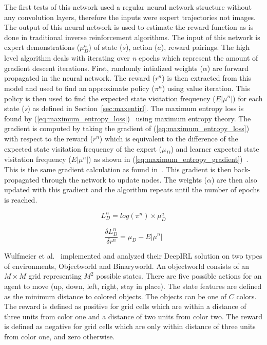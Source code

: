 \documentclass[12pt,american]{report}
\begin{document}
The first tests of this network used a regular neural network structure without any convolution layers, therefore the inputs were expert trajectories not images. The output of this neural network is used to estimate the reward function as is done in traditional inverse reinforcement algorithms. The input of this network is expert demonstrations ($\mu_{D}^{a}$) of state ($s$), action ($a$), reward pairings. The high level algorithm deals with iterating over \textit{n} epochs which represent the amount of gradient descent iterations. First, randomly intialized weights ($\alpha$) are forward propagated in the neural network.  The reward ($r^n$) is then extracted from this model and used to find an approximate policy ($\pi^n$) using value iteration. This policy is then used to find the expected state visitation frequency ($E|\mu^n|$) for each state (\textit{s}) as defined in Section~\ref{sec:maxentirl}.  The maximum entropy loss is found by (\ref{eq:maximum_entropy_loss})~\cite{wulfmeier2015maximum} using maximum entropy theory. The gradient is computed by taking the gradient of (\ref{eq:maximum_entropy_loss}) with respect to the reward ($r^n$) which is equivalent to the difference of the expected state visitation frequency of the expert ($\mu_D$) and learner expected state visitation frequency ($E|\mu^n|$) as shown in (\ref{eq:maximum_entropy_gradient})~\cite{wulfmeier2015maximum}.  This is the same gradient calculation as found in~\cite{ziebart2008maximum}.  This gradient is then back-propagated through the network to update nodes.  The weights ($\alpha$) are then also updated with this gradient and the algorithm repeats until the number of epochs is reached. 

\begin{equation}
            \label{eq:maximum_entropy_loss}
            L_{D}^{n}=log(\pi^n) \times \mu_{D}^{a}%
        \end{equation}

\begin{equation}
            \label{eq:maximum_entropy_gradient}
           \frac{\delta L_{D}^{n}}{\delta r^{n}}=\mu_D -  E|\mu^n|%
        \end{equation}

Wulfmeier et al.~\cite{wulfmeier2015maximum} implemented and analyzed their DeepIRL solution on two types of environments, Objectworld and Binaryworld. An objectworld consists of an $M\times M$ grid representing $M^2$ possible states.  There are five possible actions for an agent to move (up, down, left, right, stay in place). The state features are defined as the minimum distance to colored objects.  The objects can be one of $C$ colors. The reward is defined as positive for grid cells which are within a distance of three units from color one and a distance of two units from color two. The reward is defined as negative for grid cells which are only within distance of three units from color one, and zero otherwise.  
\end{document}
